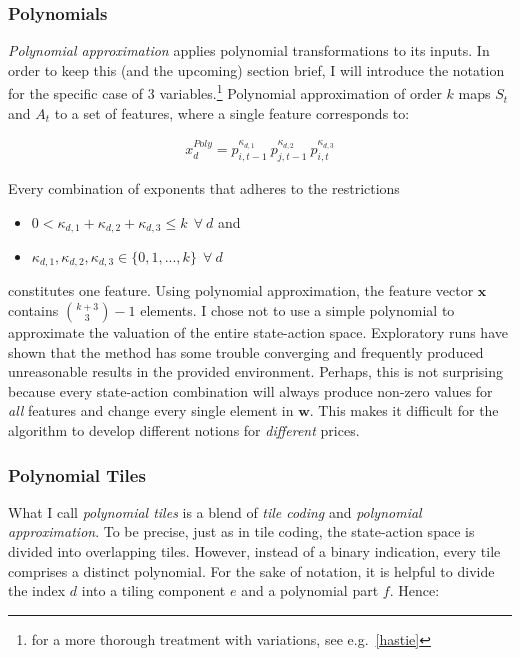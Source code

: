 \subsubsection{Polynomials}\label{polynomial}

\emph{Polynomial approximation} applies polynomial transformations to its inputs. In order to keep this (and the upcoming) section brief, I will introduce the notation for the specific case of 3 variables.\footnote{for a more thorough treatment with variations, see e.g.\ \autoref{hastie}} Polynomial approximation of order $k$ maps $S_t$ and $A_t$ to a set of features, where a single feature corresponds to:


\begin{gather}\label{polynomial_extraction}
x_d^{Poly} = p_{i, t-1}^{\kappa_{d,1}} ~ p_{j, t-1}^{\kappa_{d,2}} ~ p_{i, t}^{\kappa_{d,3}}
\end{gather}


Every combination of exponents that adheres to the restrictions

\begin{itemize}
	\item $0 < \kappa_{d,1} + \kappa_{d,2} + \kappa_{d,3} \leq k  ~~ \forall ~ d$ and
	\item $\kappa_{d,1}, \kappa_{d,2}, \kappa_{d,3} \in \{0, 1, ..., k\} ~~  \forall ~ d$
\end{itemize}

constitutes one feature. Using polynomial approximation, the feature vector $\boldsymbol{x}$ contains ${k + 3\choose3}  - 1$ elements. I chose not to use a simple polynomial to approximate the valuation of the entire state-action space. Exploratory runs have shown that the method has some trouble converging and frequently produced unreasonable results in the provided environment. Perhaps, this is not surprising because every state-action combination will always produce non-zero values for \emph{all} features and change every single element in $\boldsymbol{w}$. This makes it difficult for the algorithm to develop different notions for \emph{different} prices.

\subsubsection{Polynomial Tiles}

What I call \emph{polynomial tiles} is a blend of \emph{tile coding} and \emph{polynomial approximation}. To be precise, just as in tile coding, the state-action space is divided into overlapping tiles. However, instead of a binary indication, every tile comprises a distinct polynomial. For the sake of notation, it is helpful to divide the index $d$ into a tiling component $e$ and a polynomial part $f$.  Hence:

